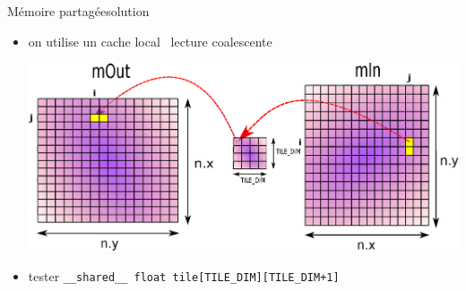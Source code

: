 \documentclass[11pt,mathserif]{beamer}
\newcommand{\gezi}{\faLongArrowRight}
\newcommand{\argi}{\faLightbulbO}
\newcommand{\pozik}{\faSmileO}
\begin{document}
\begin{frame}{Mémoire partagée}{solution}
  \begin{itemize}[<+->]
    \item[\argi] on utilise un cache local \gezi\ lecture coalescente \pozik
  
\begin{center}
  \includegraphics[width=0.60\linewidth]{fig/transpose2.eps}
\end{center}
   \item[\faMagic] tester {\tt \_\_shared\_\_ float tile[TILE\_DIM][TILE\_DIM+1]} 
   \end{itemize}
\end{frame}
\end{document}
